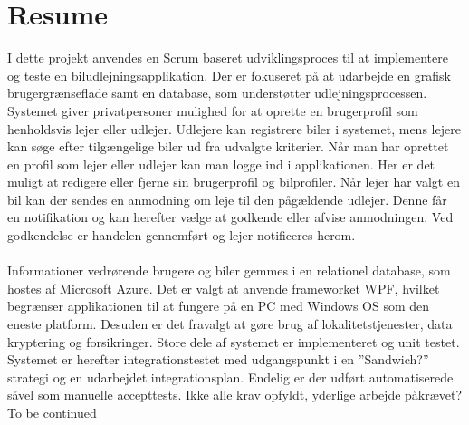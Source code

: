 \documentclass[Rapport/Rapport_main.tex]{subfiles}
\begin{document}
\section{Resume}
I dette projekt anvendes en Scrum baseret udviklingsproces til at implementere og teste en biludlejningsapplikation. Der er fokuseret på at udarbejde en grafisk brugergrænseflade samt en database, som understøtter udlejningsprocessen. Systemet giver privatpersoner mulighed for at oprette en brugerprofil som henholdsvis lejer eller udlejer. Udlejere kan registrere biler i systemet, mens lejere kan søge efter tilgængelige biler ud fra udvalgte kriterier. Når man har oprettet en profil som lejer eller udlejer kan man logge ind i applikationen. Her er det muligt at redigere eller fjerne sin brugerprofil og bilprofiler. Når lejer har valgt en bil kan der sendes en anmodning om leje til den pågældende udlejer. Denne får en notifikation og kan herefter vælge at godkende eller afvise anmodningen. Ved godkendelse er handelen gennemført og lejer notificeres herom. \\\\Informationer vedrørende brugere og biler gemmes i en relationel database, som hostes af Microsoft Azure. Det er valgt at anvende frameworket WPF, hvilket begrænser applikationen til at fungere på en PC med Windows OS som den eneste platform. Desuden er det fravalgt at gøre brug af lokalitetstjenester, data kryptering og forsikringer. Store dele af systemet er implementeret og unit testet. Systemet er herefter integrationstestet med udgangspunkt i en ''Sandwich?'' strategi og en udarbejdet integrationsplan. Endelig er der udført automatiserede såvel som manuelle accepttests. Ikke alle krav opfyldt, yderlige arbejde påkrævet? To be continued
\end{document}
